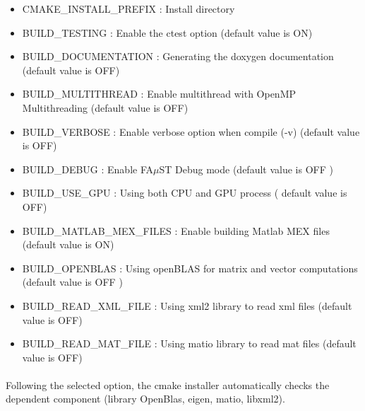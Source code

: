 \begin{itemize}
\item CMAKE\_INSTALL\_PREFIX : Install directory
\item BUILD\_TESTING : Enable the ctest option (default value is ON)
\item BUILD\_DOCUMENTATION : Generating the doxygen documentation (default value is OFF)  
\item BUILD\_MULTITHREAD : Enable multithread with OpenMP Multithreading (default value is OFF)
\item BUILD\_VERBOSE : Enable verbose option when compile (-v) (default value is OFF)
\item BUILD\_DEBUG : Enable FA$\mu$ST Debug mode (default value is OFF )
\item BUILD\_USE\_GPU : Using both CPU and GPU process ( default value is OFF)
\item BUILD\_MATLAB\_MEX\_FILES : Enable building Matlab MEX files (default value is ON)
\item BUILD\_OPENBLAS : Using openBLAS for matrix and vector computations (default value is OFF )
\item BUILD\_READ\_XML\_FILE : Using xml2 library to read xml files (default value is OFF)
\item BUILD\_READ\_MAT\_FILE : Using matio library to read mat files (default value is OFF)
\end{itemize}

\paragraph{}Following the selected option, the cmake installer automatically checks the dependent component (library OpenBlas, eigen, matio, libxml2).  




